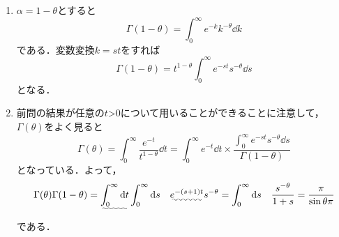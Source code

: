 \documentclass[a4paper,pdflatex,ja=standard]{bxjsarticle}
\begin{document}
\begin{enumerate}
  \item 
  $\alpha=1-\theta$とすると
  \begin{equation}
    \Gamma(1-\theta)
    =
    \int_{0}^{\infty}
    e^{-k}k^{-\theta}
    \dd k
  \end{equation}
  である．変数変換$k=st$をすれば
  \begin{equation}
    \Gamma(1-\theta)
    =
    t^{1-\theta}
    \int_{0}^{\infty}
    e^{-st}s^{-\theta}
    \dd s
  \end{equation}
  となる．

  \item 
  前問の結果が任意の$t$>0について用いることができることに注意して，$\Gamma(\theta)$をよく見ると
  \begin{equation}
    \Gamma(\theta)
    =
    \int_{0}^{\infty}
    \frac{e^{-t}}{t^{1-\theta}}
    \dd t
    =
    \int_{0}^{\infty}
    e^{-t}
    \dd t
    \times
    \dfrac{\int_{0}^{\infty}e^{-st}s^{-\theta}\dd s}{\Gamma(1-\theta)}
  \end{equation}
  となっている．よって，
  \begin{equation}
    \Gamma(\theta)\Gamma(1-\theta)
    =
    \uwave{\int_{0}^{\infty}\dd t}\int_{0}^{\infty}\dd s
    \quad
    \uwave{e^{-(s+1)t}}s^{-\theta}
    =
    \int_{0}^{\infty}
    \dd s
    \quad
    \frac{s^{-\theta}}{1+s}
    =
    \frac{\pi}{\sin\theta\pi}
  \end{equation}
  である．

\end{enumerate}
\end{document}

